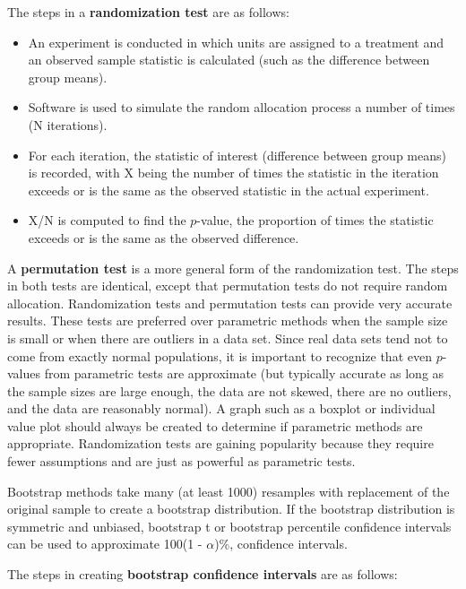 \documentclass[
]{report}
\begin{document}
The steps in a \textbf{randomization test} are as follows:
\vspace{-1em}

\begin{itemize}
\item An experiment is conducted in which units are assigned to a treatment and an observed sample statistic is calculated (such as the difference between group means).
\item Software is used to simulate the random allocation process a number of times (N iterations).
\item For each iteration, the statistic of interest (difference between group means) is recorded, with X being
the number of times the statistic in the iteration exceeds or is the same as the observed statistic in the
actual experiment.
\item X/N is computed to find the $\scriptstyle p$-value, the proportion of times the statistic exceeds or is the same as the observed difference.
\end{itemize}

A \textbf{permutation test} is a more general form of the randomization test. The steps in both tests are identical, except that permutation tests do not require random allocation. Randomization tests and permutation tests can provide very accurate results. These tests are preferred over parametric methods when the sample size is small or when there are outliers in a data set. Since real data sets tend not to come from exactly normal populations, it is important to recognize that even \(\scriptstyle p\)-values from parametric tests are approximate (but typically accurate as long as the sample sizes are large enough, the data are not skewed, there are no outliers, and the data are reasonably normal). A graph such as a boxplot or individual value plot should always be created to determine if parametric methods are appropriate. Randomization tests are gaining popularity because they require fewer assumptions and are just as powerful as parametric tests.

Bootstrap methods take many (at least 1000) resamples with replacement of the original sample to create a bootstrap distribution. If the bootstrap distribution is symmetric and unbiased, bootstrap t or bootstrap percentile confidence intervals can be used to approximate 100(1 - \(\scriptstyle \alpha\))\%, confidence intervals.

The steps in creating \textbf{bootstrap confidence intervals} are as follows:
\vspace{-1em}
\end{document}
